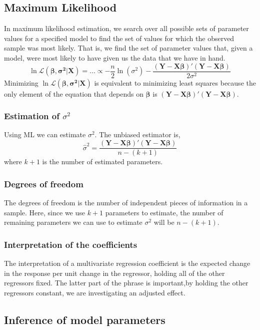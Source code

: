 \subsection{Maximum Likelihood}
In maximum likelihood estimation, we search over all possible sets of parameter
values for a specified model to find the set of values for which the observed
sample was most likely. That is, we find the set of parameter values that, given
a model, were most likely to have given us the data that we have in hand.
\begin{equation}
    \ln \mathcal{L}(\bm{\beta, \sigma^2|X}) = \dots \propto -\frac{n}{2}\ln(\sigma^2)-\frac{\bm{(Y-X\beta)'(Y-X\beta)}}{2\sigma^2}
\end{equation}
Minimizing $\ln \mathcal{L}(\bm{\beta, \sigma^2|X})$ is equivalent to minimizing
least squares because the only element of the equation that depends on $\bm{\beta}$
is $\bm{(Y-X\beta)'(Y-X\beta)}$.

\subsubsection{Estimation of $\sigma^2$}
Using ML we can estimate $\sigma^2$. The unbiased estimator is,
\begin{equation}
    \hat{\sigma}^2 = \frac{\bm{(Y-X\beta)'(Y-X\beta)}}{n-(k+1)}
\end{equation}
where $k+1$ is the number of estimated parameters.

\subsubsection{Degrees of freedom}
The degrees of freedom is the number of independent pieces of information in a sample. Here,
since we use $k+1$ parameters to estimate, the number of remaining parameters we can use
to estimate $\sigma^2$ will be $n-(k+1)$.

\subsubsection{Interpretation of the coefficients}
The interpretation of a multivariate regression coefficient is the expected
change in the response per unit change in the regressor, holding all of the other
regressors fixed. The latter part of the phrase is important,by holding the
other regressors constant, we are investigating an adjusted effect.

\subsection{Inference of model parameters}
